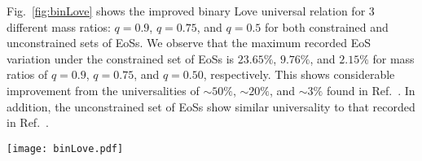 \documentclass[prd,twocolumn,nofootinbib,superscriptaddress,amsmath,amssymb]{revtex4-1}
\begin{document}
Fig.~\ref{fig:binLove} shows the improved binary Love universal relation for 3 different mass ratios: $q=0.9$, $q=0.75$, and $q=0.5$ for both constrained and unconstrained sets of EoSs.
We observe that the maximum recorded EoS variation under the constrained set of EoSs is $23.65\%$, $9.76\%$, and $2.15\%$ for mass ratios of $q=0.9$, $q=0.75$, and $q=0.50$, respectively.
This shows considerable improvement from the universalities of $\sim 50\%$, $\sim 20\%$, and $\sim 3\%$ found in Ref.~\cite{Yagi:binLove}.
In addition, the unconstrained set of EoSs show similar universality to that recorded in Ref.~\cite{Yagi:binLove}.
\begin{figure*}
\begin{center} 
\texttt{[image: binLove.pdf]}
\end{center}
\caption{
Binary Love universal relations shown for the constrained EoSs (left) and unconstrained EoSs (right).
In this figure, the solid black line corresponds to the fit given by Eq.~\ref{eq:binLovefit}, while the solid, dashed, and dotted colored lines represent the 35 EoSs for mass ratios of $q=0.9$, $q=0.75$, and $q=0.50$, respectively.
The maximal EoS variation for each value of $q$ is $23.65\%$, $9.76\%$, and $2.15\%$ respectively, compared to $\sim 50\%$, $\sim 20\%$, and $\sim 3\%$ found in Ref.~\cite{Yagi:binLove}.
These values are comparable to the maximal EoS variation for unconstrained EoSs as expected, found to be $41.66\%$, $12.64\%$, and $3.83\%$.
}
\label{fig:binLove}
\end{figure*} 
\end{document}
